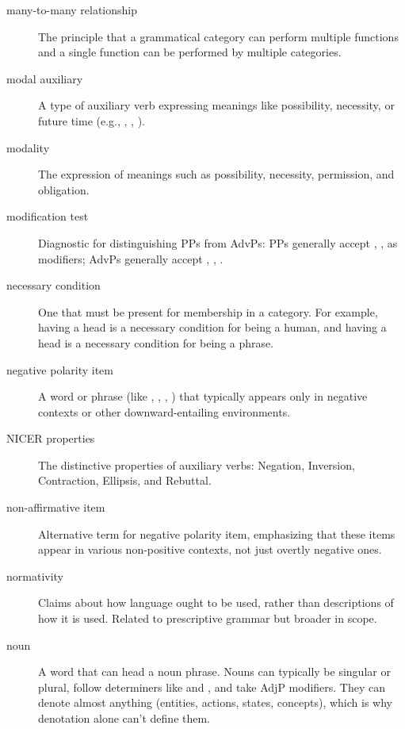\begin{description}
\item[many-to-many relationship] The principle that a grammatical category can perform multiple functions and a single function can be performed by multiple categories.

\item[modal auxiliary] A type of auxiliary verb expressing meanings like possibility, necessity, or future time (e.g., , , ).

\item[modality] The expression of meanings such as possibility, necessity, permission, and obligation.

\item[modification test] Diagnostic for distinguishing PPs from AdvPs: PPs generally accept , ,  as modifiers; AdvPs generally accept , , .

\item[necessary condition] One that must be present for membership in a category. For example, having a head is a necessary condition for being a human, and having a head is a necessary condition for being a phrase.

\item[negative polarity item] A word or phrase (like , , , ) that typically appears only in negative contexts or other downward-entailing environments.

\item[NICER properties] The distinctive properties of auxiliary verbs: Negation, Inversion, Contraction, Ellipsis, and Rebuttal.

\item[non-affirmative item] Alternative term for negative polarity item, emphasizing that these items appear in various non-positive contexts, not just overtly negative ones.

\item[normativity] Claims about how language ought to be used, rather than descriptions of how it is used. Related to prescriptive grammar but broader in scope.

\item[noun] A word that can head a noun phrase. Nouns can typically be singular or plural, follow determiners like  and , and take AdjP modifiers. They can denote almost anything (entities, actions, states, concepts), which is why denotation alone can't define them.


\end{description}
